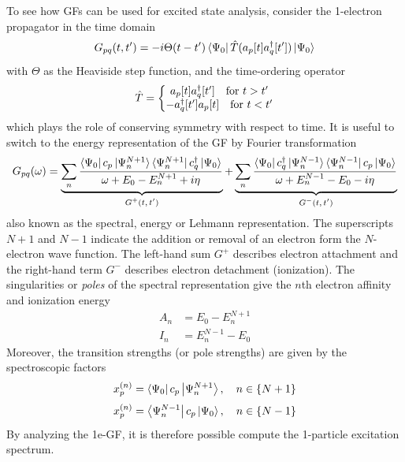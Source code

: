 To see how GFs can be used for excited state analysis, consider the 1-electron propagator in the time domain
\begin{equation}
G_{pq}(t,t') = - i\Theta(t-t') \bra{\smash{\Psi_0}} \hat{T}(a_p[t]a
_q^{\dagger}[t']) \ket{\smash{\Psi_0}}
\end{equation}
\noindent with $\Theta$ as the Heaviside step function, and the time-ordering operator 
\begin{equation}
\hat{T} = \left\lbrace \begin{matrix}
a_p[t] a_q^{\dagger}[t'] \quad \textrm{for } t > t' \\
-a_q^{\dagger}[t'] a_p[t] \quad \textrm{for } t < t'
\end{matrix}
\right.
\end{equation}
\noindent which plays the role of conserving symmetry with respect to time. It is useful to switch to the energy representation of the GF by Fourier transformation
\begin{equation}
G_{pq} (\omega) = \underbrace{ \sum_n \frac{
	\bra{\smash{\Psi_0}} c_p \ket{\smash{\Psi_n^{N+1}}}			    \bra{\smash{\Psi_n^{N+1}}} c_q ^{\dagger} \ket{\smash{\Psi_0}} 
}{
	\omega + E_0 - E_n^{N+1} + i \eta
}
}_{\text{$G^{+}(t,t')$}} + 
\underbrace{
\sum_n \frac{
	\bra{\smash{\Psi_0}} c_q ^{\dagger} \ket{\smash{\Psi_n^{N-1}}}			    \bra{\smash{\Psi_n^{N-1}}} c_p \ket{\smash{\Psi_0}}
}{
	\omega + E_n^{N-1} - E_0 - i \eta
}
}_{\text{$G^{-}(t,t')$}}
\end{equation}
\noindent also known as the spectral, energy or Lehmann representation. The superscripts $N+1$ and $N-1$ indicate the addition or removal of an electron form the $N$-electron wave function. The left-hand sum $G^{+}$ describes electron attachment and the right-hand term $G^{-}$ describes electron detachment (ionization). The singularities or \emph{poles} of the spectral representation give the $n$th electron affinity and ionization energy 
\begin{align}
A_n &= E_0 - E_n^{N+1} \\
I_n &= E_n^{N-1} - E_0
\end{align}
\noindent Moreover, the transition strengths (or pole strengths) are given by the spectroscopic factors 
\begin{equation}
x_p^{(n)} = \bra{\Psi_0 } c_p \ket{\Psi_n ^{N+1} }, \quad n \in \left\lbrace N + 1 \right\rbrace
\end{equation}
\begin{equation}
x_p^{(n)} = \bra{\Psi_n^{N-1} } c_p \ket{\Psi_0 }, \quad n \in \left\lbrace N - 1 \right\rbrace
\end{equation}
\noindent By analyzing the 1e-GF, it is therefore possible compute the 1-particle excitation spectrum. 

